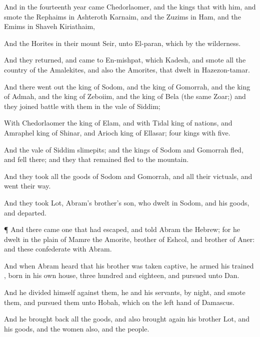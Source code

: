 {And in the
fourteenth
year
came
Chedorlaomer, and the
kings that
{} with him, and
smote the
Rephaims in Ashteroth
Karnaim, and the
Zuzims in
Ham, and the
Emims in Shaveh
Kiriathaim,

And the
Horites in their
mount
Seir, unto
El-paran, which
{}
by the
wilderness.

And they
returned, and
came
to
En-mishpat, which
{}
Kadesh, and
smote all the
country of the
Amalekites, and also the
Amorites, that
dwelt in
Hazezon-tamar.

And there went
out the
king of
Sodom, and the
king of
Gomorrah, and the
king of
Admah, and the
king of
Zeboiim, and the
king of
Bela (the
same
{}
Zoar;) and they
joined
battle with them in the
vale of
Siddim;

With
Chedorlaomer the
king of
Elam, and with
Tidal
king of
nations, and
Amraphel
king of
Shinar, and
Arioch
king of
Ellasar;
four
kings with
five.

And the
vale of
Siddim
{}
slimepits; and the
kings of
Sodom and
Gomorrah
fled, and
fell there; and they that
remained
fled to the
mountain.

And they
took all the
goods of
Sodom and
Gomorrah, and all their
victuals, and went their
way.

And they
took
Lot,
Abram’s
brother’s
son, who
dwelt in
Sodom, and his
goods, and
departed.


\par }{\PP {}¶ And there
came one that had
escaped, and
told
Abram the
Hebrew; for he
dwelt in the
plain of
Mamre the
Amorite,
brother of
Eshcol, and
brother of
Aner: and these
{}
confederate with
Abram.

And when
Abram
heard that his
brother was taken
captive, he
armed his
trained
{},
born in his own
house,
three
hundred and
eighteen, and
pursued
{} unto
Dan.

And he
divided himself against them, he and his
servants, by
night, and
smote them, and
pursued them unto
Hobah, which
{} on the left
hand of
Damascus.

And he brought
back all the
goods, and also brought
again his
brother
Lot, and his
goods, and the
women also, and the
people.


}
